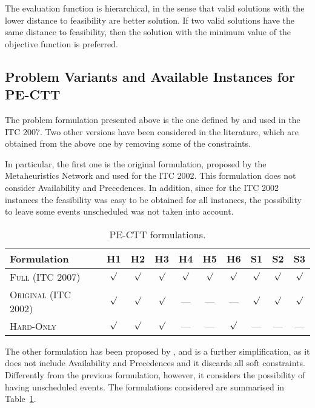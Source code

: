 \documentclass[authoryear,preprint,a4paper,12pt]{elsarticle}
\begin{document}
The evaluation function is hierarchical, in the sense that valid solutions with the lower distance to feasibility are better solution. If two valid solutions have the same distance
to feasibility, then the solution with the minimum value of the
objective function is preferred.

\subsection{Problem Variants and Available Instances for PE-CTT}
\label{sec:instances}

The problem formulation presented above is the one defined by
\citet{LePM07} and used in the ITC 2007. Two other versions have been
considered in the literature, which are obtained from the above one by
removing some of the constraints.

In particular, the first one is the original formulation, proposed by
the Metaheuristics Network \citep{RSBC03} and used for the ITC 2002.
This formulation does not consider \textsf{Availability} and
\textsf{Precedences}. In addition, since for the ITC 2002 instances
the feasibility was easy to be obtained for all instances, the
possibility to leave some events unscheduled was not taken into account.

\begin{table}
  \centering
  \footnotesize
  \begin{tabular}{|l|*{6}{c}|ccc|} 
    \hline
    Formulation           & H1 & H2 & H3 & H4 & H5 & H6 & S1 & S2 & S3 \\ \hline
    \textsc{Full} (ITC 2007)       &  $\surd$ &  $\surd$ & $\surd$ & $\surd$ & $\surd$ & $\surd$ & $\surd$ & $\surd$ & $\surd$\\
    \textsc{Original} (ITC 2002) &  $\surd$ &  $\surd$ & $\surd$ & --- & --- &  --- & $\surd$ & $\surd$ & $\surd$ \\
    \textsc{Hard-Only}             &  $\surd$ &  $\surd$ & $\surd$ & --- & --- & $\surd$ & --- & --- & --- \\ \hline
  \end{tabular}
  \caption{PE-CTT formulations.}
  \label{tab:formulations}
\end{table}

The other formulation has been proposed by \cite{LePa05}, and is a
further simplification, as it does not include
\textsf{Availability} and \textsf{Precedences} and it discards
all soft constraints. Differently from the previous formulation,
however, it considers the possibility of having unscheduled events.
The formulations considered are summarised in
Table~\ref{tab:formulations}.
\end{document}
